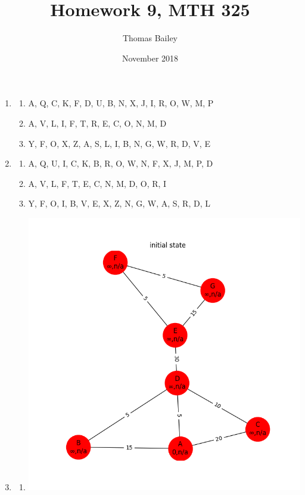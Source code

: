 \documentclass{article}
\title{Homework 9, MTH 325}
\author{Thomas Bailey}
\date{November 2018}
\begin{document}
\maketitle

\begin{enumerate}
\item
  \begin{enumerate}
    \item A, Q, C, K, F, D, U, B, N, X, J, I, R, O, W, M, P
    \item A, V, L, I, F, T, R, E, C, O, N, M, D
    \item Y, F, O, X, Z, A, S, L, I, B, N, G, W, R, D, V, E
  \end{enumerate}
\item \addtocounter{enumi}{1}
  \begin{enumerate}
    \item A, Q, U, I, C, K, B, R, O, W, N, F, X, J, M, P, D
    \item A, V, L, F, T, E, C, N, M, D, O, R, I
    \item Y, F, O, I, B, V, E, X, Z, N, G, W, A, S, R, D, L
  \end{enumerate}
\item
  \begin{enumerate}
  \item
    \includegraphics[width=\textwidth,height=\textheight,keepaspectratio]{4a0}

\end{enumerate}
\end{enumerate}
\end{document}
